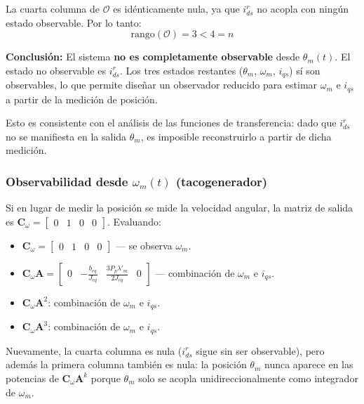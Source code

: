 \documentclass[12pt, a4paper,journal, onecolumn, compsoc]{IEEEtran}
\begin{document}
La cuarta columna de $\mathcal{O}$ es idénticamente nula, ya que $i_{ds}^r$ no acopla con ningún estado observable. Por lo tanto:
\begin{equation}
    \text{rango}(\mathcal{O}) = 3 < 4 = n
\end{equation}

\textbf{Conclusión:} El sistema \textbf{no es completamente observable} desde $\theta_m(t)$. El estado no observable es $i_{ds}^r$. Los tres estados restantes ($\theta_m$, $\omega_m$, $i_{qs}$) sí son observables, lo que permite diseñar un observador reducido para estimar $\omega_m$ e $i_{qs}$ a partir de la medición de posición.

Esto es consistente con el análisis de las funciones de transferencia: dado que $i_{ds}^r$ no se manifiesta en la salida $\theta_m$, es imposible reconstruirlo a partir de dicha medición.

\subsubsection{Observabilidad desde \texorpdfstring{$\omega_m(t)$}{omega_m(t)} (tacogenerador)}
Si en lugar de medir la posición se mide la velocidad angular, la matriz de salida es $\mathbf{C}_\omega = \begin{bmatrix} 0 & 1 & 0 & 0 \end{bmatrix}$. Evaluando:
\begin{itemize}
    \item $\mathbf{C}_\omega = \begin{bmatrix} 0 & 1 & 0 & 0 \end{bmatrix}$ --- se observa $\omega_m$.
    \item $\mathbf{C}_\omega\mathbf{A} = \begin{bmatrix} 0 & -\frac{b_{eq}}{J_{eq}} & \frac{3P_p\lambda'_m}{2J_{eq}} & 0 \end{bmatrix}$ --- combinación de $\omega_m$ e $i_{qs}$.
    \item $\mathbf{C}_\omega\mathbf{A}^2$: combinación de $\omega_m$ e $i_{qs}$.
    \item $\mathbf{C}_\omega\mathbf{A}^3$: combinación de $\omega_m$ e $i_{qs}$.
\end{itemize}

Nuevamente, la cuarta columna es nula ($i_{ds}^r$ sigue sin ser observable), pero además la primera columna también es nula: la posición $\theta_m$ nunca aparece en las potencias de $\mathbf{C}_\omega\mathbf{A}^k$ porque $\theta_m$ solo se acopla unidireccionalmente como integrador de $\omega_m$.
\end{document}
